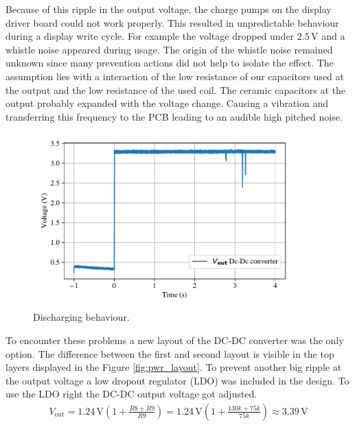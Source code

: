 Because of this ripple in the output voltage, the charge pumps on the display driver board could not work properly. This resulted in unpredictable behaviour during a display write cycle. For example the voltage dropped under $2.5$\,V and a whistle noise appeared during usage. The origin of the whistle noise remained unknown since many prevention actions did not help to isolate the effect. The assumption lies with a interaction of the low resistance of our capacitors used at the output and the low resistance of the used coil. The ceramic capacitors at the output probably expanded with the voltage change. Causing a vibration and transferring this frequency to the PCB leading to an audible high pitched noise. 

\begin{figure}[ht]
	\centering
	\includegraphics[width=0.9\textwidth]{4-development/hardware/graphics/scope/Vdrop.pdf}
	\caption{Discharging behaviour.\label{development:vdrop}}
\end{figure}
To encounter these problems a new layout of the DC-DC converter was the only option. The difference between the first and second layout is visible in the top layers displayed in the Figure \ref{fig:pwr_layout}. To prevent another big ripple at the output voltage a low  dropout regulator (LDO) was included in the design. To use the LDO right the DC-DC output voltage got adjusted.
\begin{align}
V_{\text{out}}= 1.24\,\text{V} \left(1 + \frac{R8+R9}{R9} \right)= 1.24\,\text{V} \left(1 + \frac{130k+75k}{75k} \right) \approx 3.39\,\text{V} 
\end{align}

